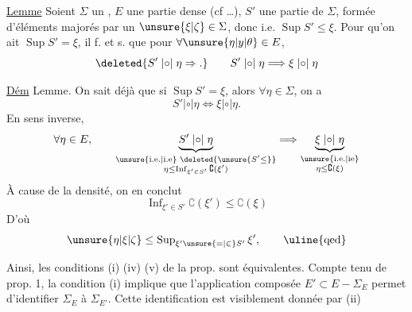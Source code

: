 
\uline{Lemme} Soient $\Sigma$ un , $E$ une partie dense (cf \ldots), $S'$ une partie de $\Sigma$, formée d'éléments majorés par un $\unsure{\xi|\zeta}\in\Sigma$, donc i.e. $\operatorname{Sup}S'\leq\xi$. Pour qu'on ait $\operatorname{Sup}S'=\xi$, il f. et s. que pour $\forall\unsure{\eta|y|\theta}\in E$, 
\[
\deleted{S'\mathrel{|{\circ}|}\eta\Rightarrow.}\qquad
S'\mathrel{|{\circ}|}\eta\Longrightarrow\xi\mathrel{|{\circ}|}\eta
\]

\uline{Dém}  Lemme. On sait déjà que si $\operatorname{Sup}S'=\xi$, alors $\forall\eta\in\Sigma$, on a
\[
S'\mathrel{|{\circ}|}\eta\Longleftrightarrow\xi\mathrel{|{\circ}|}\eta.
\]
En sens inverse, 
\[
\forall\eta\in E,\qquad
\underbrace{S'\mathrel{|{\circ}|}\eta}_{\substack{\text{\unsure{i.e.|i.e} }\deleted{\unsure{S'\leq}}\\\eta\leq\operatorname{Inf}_{\xi'\in S'}\complement(\xi')}}
\Longrightarrow
\underbrace{\xi\mathrel{|{\circ}|}\eta}_{\substack{\text{\unsure{i.e.|ie}}\\\eta\leq\complement(\xi)}}
\]
À cause de la densité, on en conclut
\[
\operatorname{Inf}_{\xi'\in S'}\complement(\xi')\leq\complement(\xi)
\]
D'où
\[
\unsure{\eta|\xi|\zeta}\leq\operatorname{Sup}_{\xi'\unsure{=|\in}S'}\xi',\qquad\text{\uline{qed}}
\]

Ainsi, les conditions (i) (iv) (v) de la prop. sont équivalentes. Compte tenu de prop. 1, la condition (i) implique que l'application composée $E'\subset E\mathbin{-}\Sigma_E$ permet d'identifier $\Sigma_E$ à $\Sigma_{E'}$. Cette identification est visiblement donnée par (ii)
